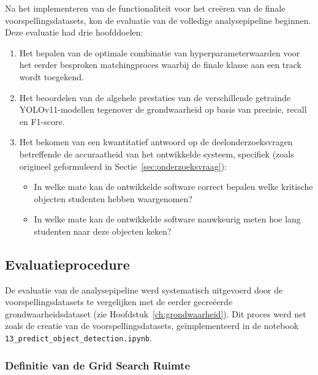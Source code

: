 Na het implementeren van de functionaliteit voor het creëren van de finale voorspellingsdatasets, 
kon de evaluatie van de volledige analysepipeline beginnen.\\ Deze evaluatie had drie hoofddoelen:
\begin{enumerate}
    \item Het bepalen van de optimale combinatie van hyperparameterwaarden voor het eerder besproken matchingproces waarbij de finale klasse aan een track wordt toegekend.
    \item Het beoordelen van de algehele prestaties van de verschillende getrainde\\ YOLOv11-modellen tegenover de grondwaarheid op basis van precisie, recall en F1-score.
    \item Het bekomen van een kwantitatief antwoord op de deelonderzoeksvragen betreffende de accuraatheid van het 
    ontwikkelde systeem, specifiek (zoals origineel geformuleerd in Sectie~\ref{sec:onderzoeksvraag}):
        \begin{itemize}
            \item In welke mate kan de ontwikkelde software correct bepalen welke kritische objecten studenten hebben waargenomen?
            \item In welke mate kan de ontwikkelde software nauwkeurig meten hoe lang studenten naar deze objecten keken?
        \end{itemize}
\end{enumerate}

\subsection{Evaluatieprocedure}

De evaluatie van de analysepipeline werd systematisch uitgevoerd door de voorspellingsdatasets 
te vergelijken met de eerder gecreëerde grondwaarheidsdataset (zie Hoofdstuk~\ref{ch:grondwaarheid}). 
Dit proces werd net zoals de creatie van de voorspellingsdatasets,
geïmplementeerd in de notebook \texttt{13\_predict\_object\_detection.ipynb}.

\subsubsection{Definitie van de Grid Search Ruimte}

